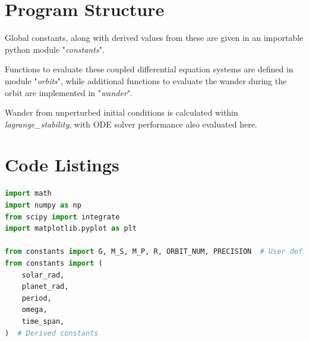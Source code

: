 \documentclass[11pt, a4paper,twocolumn]{article} %
\begin{document}
\onecolumn
\begin{appendices}
\section{Program Structure} \label{structure}
Global constants, along with derived values from these are given in an importable python module "\textit{constants}".

Functions to evaluate these coupled differential equation systems are defined in module "\textit{orbits}", while additional functions to evaluate the wander during the orbit are implemented in "\textit{wander}".

Wander from unperturbed initial conditions is calculated within \textit{lagrange\_stability}, with ODE solver performance also evaluated here.


\section{Code Listings} \label{Code}
\begin{lstlisting}[language=Python]
import math
import numpy as np
from scipy import integrate
import matplotlib.pyplot as plt

from constants import G, M_S, M_P, R, ORBIT_NUM, PRECISION  # User defined constants
from constants import (
	solar_rad,
	planet_rad,
	period,
	omega,
	time_span,
)  # Derived constants


\end{lstlisting}

\end{appendices}
\end{document}
